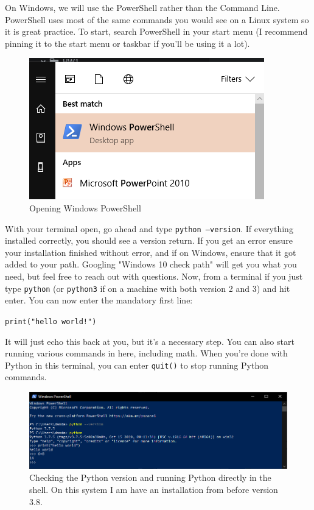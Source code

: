 \documentclass[oneside]{book}
\begin{document}
On Windows, we will use the PowerShell rather than the Command Line. PowerShell uses most of the same commands you would see on a Linux system so it is great practice. To start, search PowerShell in your start menu (I recommend pinning it to the start menu or taskbar if you'll be using it a lot). 

\begin{figure}[H]
\centering
\includegraphics[width=0.5\linewidth]{./img/powershell.PNG}
\caption{Opening Windows PowerShell}
\label{fig:powershell}
\end{figure}

With your terminal open, go ahead and type \texttt{python --version}. If everything installed correctly, you should see a version return. If you get an error ensure your installation finished without error, and if on Windows, ensure that it got added to your path. Googling "Windows 10 check path" will get you what you need, but feel free to reach out with questions. Now, from a terminal if you just type \texttt{python} (or \texttt{python3} if on a machine with both version 2 and 3) and hit enter. You can now enter the mandatory first line:

\texttt{print("hello world!")}

It will just echo this back at you, but it's a necessary step. You can also start running various commands in here, including math. When you're done with Python in this terminal, you can enter \texttt{quit()} to stop running Python commands.

\begin{figure}[H]
\centering
\includegraphics[width=0.7\linewidth]{./img/pythonTestRun.PNG}
\caption{Checking the Python version and running Python directly in the shell. On this system I am have an installation from before version 3.8.}
\label{fig:powershellTest}
\end{figure}
\end{document}
